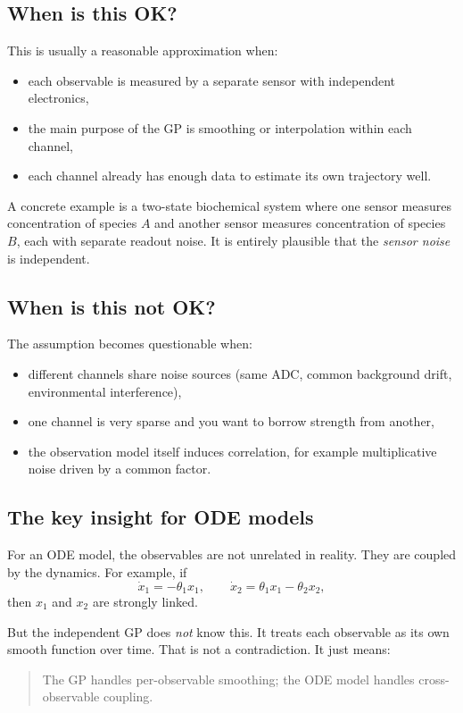 \documentclass[11pt]{article}
\begin{document}
\subsection*{When is this OK?}
This is usually a reasonable approximation when:
\begin{itemize}
    \item each observable is measured by a separate sensor with independent electronics,
    \item the main purpose of the GP is smoothing or interpolation within each channel,
    \item each channel already has enough data to estimate its own trajectory well.
\end{itemize}

A concrete example is a two-state biochemical system where one sensor measures concentration of species $A$ and another sensor measures concentration of species $B$, each with separate readout noise. It is entirely plausible that the \emph{sensor noise} is independent.

\subsection*{When is this not OK?}
The assumption becomes questionable when:
\begin{itemize}
    \item different channels share noise sources (same ADC, common background drift, environmental interference),
    \item one channel is very sparse and you want to borrow strength from another,
    \item the observation model itself induces correlation, for example multiplicative noise driven by a common factor.
\end{itemize}

\subsection*{The key insight for ODE models}
For an ODE model, the observables are not unrelated in reality. They are coupled by the dynamics. For example, if
\[
\dot{x}_1 = -\theta_1 x_1,
\qquad
\dot{x}_2 = \theta_1 x_1 - \theta_2 x_2,
\]
then $x_1$ and $x_2$ are strongly linked.

But the independent GP does \emph{not} know this. It treats each observable as its own smooth function over time. That is not a contradiction. It just means:
\begin{quote}
The GP handles per-observable smoothing; the ODE model handles cross-observable coupling.
\end{quote}
\end{document}
